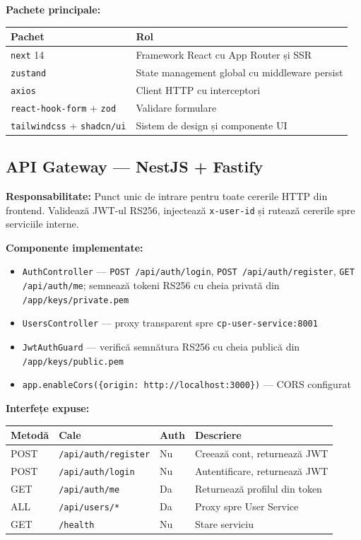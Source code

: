 \documentclass[12pt, a4paper]{report}
\begin{document}
\textbf{Pachete principale:}
\begin{center}
\begin{tabular}{ll}
\toprule
\textbf{Pachet} & \textbf{Rol} \\
\midrule
\texttt{next} 14 & Framework React cu App Router și SSR \\
\texttt{zustand} & State management global cu middleware persist \\
\texttt{axios} & Client HTTP cu interceptori \\
\texttt{react-hook-form} + \texttt{zod} & Validare formulare \\
\texttt{tailwindcss} + \texttt{shadcn/ui} & Sistem de design și componente UI \\
\bottomrule
\end{tabular}
\end{center}

\subsection{API Gateway — NestJS + Fastify}

\textbf{Responsabilitate:} Punct unic de intrare pentru toate cererile HTTP din frontend.
Validează JWT-ul RS256, injectează \texttt{x-user-id} și rutează cererile spre serviciile interne.

\textbf{Componente implementate:}
\begin{itemize}[leftmargin=*]
  \item \texttt{AuthController} — \texttt{POST /api/auth/login}, \texttt{POST /api/auth/register},
        \texttt{GET /api/auth/me}; semnează tokeni RS256 cu cheia privată din \texttt{/app/keys/private.pem}
  \item \texttt{UsersController} — proxy transparent spre \texttt{cp-user-service:8001}
  \item \texttt{JwtAuthGuard} — verifică semnătura RS256 cu cheia publică din \texttt{/app/keys/public.pem}
  \item \texttt{app.enableCors(\{origin: http://localhost:3000\})} — CORS configurat
\end{itemize}

\textbf{Interfețe expuse:}

\begin{center}
\begin{tabular}{llll}
\toprule
\rowcolor{primary!15}
\textbf{Metodă} & \textbf{Cale} & \textbf{Auth} & \textbf{Descriere} \\
\midrule
POST & \texttt{/api/auth/register} & Nu & Creează cont, returnează JWT \\
POST & \texttt{/api/auth/login} & Nu & Autentificare, returnează JWT \\
GET  & \texttt{/api/auth/me} & Da & Returnează profilul din token \\
ALL  & \texttt{/api/users/*} & Da & Proxy spre User Service \\
GET  & \texttt{/health} & Nu & Stare serviciu \\
\bottomrule
\end{tabular}
\end{center}
\end{document}

